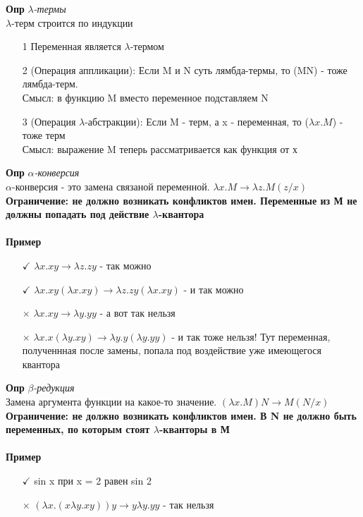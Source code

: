 \textbf{Опр} \textit{ $\lambda$-термы}\\
$\lambda$-терм строится по индукции
\begin{itemize}
    \item [1] Переменная является $\lambda$-термом
    \item[2](Операция аппликации): Если M и N суть лямбда-термы, то (MN) - тоже лямбда-терм.
    \\
    Смысл: в функцию M вместо переменное подставляем N
    \item[3](Операция $\lambda$-абстракции): Если M - терм, а x - переменная, то ($\lambda x.M$) - тоже терм \\
    Смысл: выражение M теперь рассматривается как функция от х
\end{itemize}
\textbf{Опр} \textit{$\alpha$-конверсия} \\
$\alpha$-конверсия - это замена связаной переменной. $\lambda x.M \rightarrow \lambda z.M(z/x)$
\\
\textbf{Ограничение: не должно возникать конфликтов имен. Переменные из М не должны попадать под действие $\lambda$-квантора}
\\
\\
\textbf{Пример}
\begin{itemize}
    \item [$\checkmark$] $\lambda x.xy \rightarrow \lambda z.zy$ -  так можно
     \item [$\checkmark$] $\lambda x.xy(\lambda x.xy) \rightarrow \lambda z.zy(\lambda x.xy)$ -  и так можно
     \item[$\times$] $\lambda x.xy \rightarrow \lambda y.yy$ - а вот так нельзя
      \item[$\times$] $\lambda x.x(\lambda y.xy) \rightarrow \lambda y.y(\lambda y.yy)$ - и так тоже нельзя! Тут переменная, полученнная после замены, попала под воздействие уже имеющегося квантора
\end{itemize}
\textbf{Опр} \textit{$\beta$-редукция} \\
Замена аргумента функции на какое-то значение. $(\lambda x.M)N \rightarrow M(N/x)$
\\
\textbf{Ограничение: не должно возникать конфликтов имен. В N не должно быть переменных, по которым стоят $\lambda$-кванторы в М}
\\
\\
\textbf{Пример}
\begin{itemize}
    \item[$\checkmark$] sin x при x = 2 равен sin 2
    \item[$\times $] $(\lambda x.(x \lambda y.xy))y \rightarrow y\lambda y.yy$ - так нельзя
\end{itemize}
